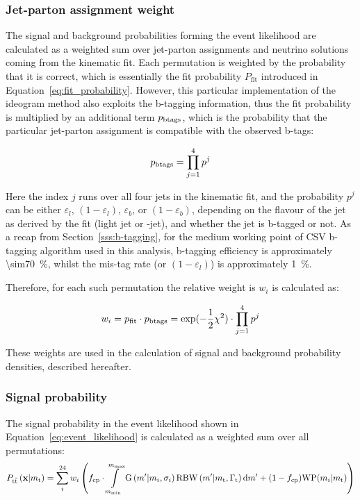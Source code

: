 \subsubsection*{Jet-parton assignment weight}
The signal and background probabilities forming the event likelihood are calculated as a weighted sum over jet-parton
assignments and neutrino solutions coming from the kinematic fit. Each permutation is weighted by the probability that
it is correct, which is essentially the fit probability $P_{\textrm{fit}}$ introduced in
Equation~\ref{eq:fit_probability}. However, this particular implementation of the ideogram method also exploits the
b-tagging information, thus the fit probability is multiplied by an additional term $p_{\rm btags}$, which is the
probability that the particular jet-parton assignment is compatible with the observed b-tags:

\begin{equation}
p_{\rm btags} = \prod_{j=1}^{4} p^{j}
\end{equation}

Here the index $j$ runs over all four jets in the kinematic fit, and the probability $p^{j}$ can be either
$\varepsilon_{l}$, $(1 - \varepsilon_{l})$, $\varepsilon_{b}$, or $(1 - \varepsilon_{b})$, depending on the flavour of
the jet as derived by the fit (light jet or \cPqb-jet), and whether the jet is b-tagged or not. As a recap from
Section~\ref{sss:b-tagging}, for the medium working point of CSV b-tagging algorithm used in this analysis, b-tagging
efficiency is approximately \SI{\sim70}{\percent}, whilst the mis-tag rate (or $(1 - \varepsilon_{l})$) is approximately
\SI{1}{\percent}.

Therefore, for each such permutation the relative weight is $w_i$ is calculated as:

\begin{equation}
w_i = p_{\rm fit} \cdot p_{\rm btags} = \textrm{exp}(-\frac{1}{2}\chi^2) \cdot \prod_{j=1}^{4} p^{j}
\label{eq:permutation_weight}
\end{equation}

These weights are used in the calculation of signal and background probability densities, described hereafter.

\subsubsection*{Signal probability}

The \ttbar signal probability in the event likelihood shown in Equation~\ref{eq:event_likelihood} is calculated as a
weighted sum over all permutations:
\begin{equation}
P_{\mathrm{t}\overline{\mathrm{t}}}\left(\mathbf{x}|m_\mathrm{t}\right) = \sum_{i}^{24} w_{i} \left( f_{\textrm{cp}} \cdot
\int\limits^{m_{\textrm{max}}}_{m_{\textrm{min}}} \textrm{G}\left(m'|m_{i},\sigma_{i}\right) \textrm{RBW}
\left(m'|m_\mathrm{t},\Gamma_{\textrm{t}}\right) \textrm{d}m' + (1 - f_{\textrm{cp}})\textrm{WP}(m_{i}|m_\mathrm{t})\right)
\end{equation}

